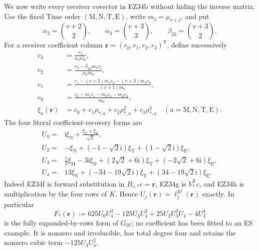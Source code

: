 \documentclass[11pt]{article}
\theoremstyle{definition}\newtheorem{definition}[theorem]{Definition}
\theoremstyle{remark}\newtheorem{remark}[theorem]{Remark}
\newcommand{\ii}{\mathrm i}
\begin{document}
We now write every receiver covector in EZ34b without hiding the inverse
matrix.  Use the fixed Time order
\((\mathrm M,\mathrm N,\mathrm T,\mathrm E)\), write
\(m_j=\mu_{v+j}\), and put
\[
 \alpha_2=\binom{v+2}{2},\qquad
 \alpha_3=\binom{v+3}{3},\qquad
 \beta_{23}=\binom{v+3}{2}.
\]
For a receiver coefficient column
\(\mathbf r=(r_0,r_1,r_2,r_3)^{\mathsf T}\), define successively
\begin{align}
 c_3&=\frac{r_3}{\alpha_3m_0},\nonumber\\
 c_2&=\frac{r_2-\beta_{23}m_1c_3}{\alpha_2m_0},\nonumber\\
 c_1&=\frac{r_1-(v+2)m_1c_2-(v+3)m_2c_3}{(v+1)m_0},\nonumber\\
 c_0&=\frac{r_0-m_1c_1-m_2c_2-m_3c_3}{m_0},          \tag{EZ34f}\\
 \xi_a(\mathbf r)&=c_0+c_1\rho_{*,a}+c_2\rho_{*,a}^2
                         +c_3\rho_{*,a}^3
 \quad(a=\mathrm M,\mathrm N,\mathrm T,\mathrm E).   \tag{EZ34g}
\end{align}
The four literal coefficient-recovery forms are
\begin{align}
 U_0={}&\ii\xi_{\mathrm N}
       +\frac{\xi_{\mathrm T}+\xi_{\mathrm E}}{\sqrt2},\nonumber\\
 U_2={}&-\xi_{\mathrm N}+(-1-\sqrt2\ii)\xi_{\mathrm T}
       +(1-\sqrt2\ii)\xi_{\mathrm E},\nonumber\\
 U_3={}&\frac{\ii}{2}\xi_{\mathrm M}-3\ii\xi_{\mathrm N}
       +(2\sqrt2+6\ii)\xi_{\mathrm T}
       +(-2\sqrt2+6\ii)\xi_{\mathrm E},\nonumber\\
 U_4={}&13\xi_{\mathrm N}+(-34-19\sqrt2\ii)\xi_{\mathrm T}
       +(34-19\sqrt2\ii)\xi_{\mathrm E}.            \tag{EZ34h}
\end{align}
Indeed EZ34f is forward substitution in
\(B_{v,*}c=\mathbf r\), EZ34g is
\(V_*^{\mathsf T}c\), and EZ34h is multiplication by the four rows of
\(K\).  Hence \(U_j(\mathbf r)=\ell_j^{\mathcal W}(\mathbf r)\) exactly.
In particular
\begin{equation}
 F_*(\mathbf r):=625U_0U_4^3-125U_3U_4^2
             +25U_2U_3^2U_4-4U_3^4                 \tag{EZ34i}
\end{equation}
is the fully expanded-by-rows form of \(G_{\mathcal W}\); no coefficient
has been fitted to an ES example.  It is nonzero and irreducible, has total
degree four and retains the nonzero cubic term \(-125U_3U_4^2\).
\end{document}
